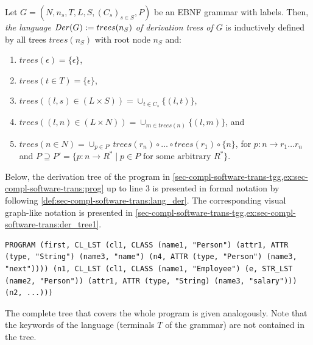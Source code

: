 \begin{definition}
\label{def:sec-compl-software-trans:lang_der}
Let $G=(N,n_s,T,L,S,(C_s)_{s \in S},P)$ be an EBNF grammar with labels.
Then, \emph{the language $\mathit{Der}(G):=trees(n_S)$ of derivation trees of $G$} is inductively defined by all trees $trees(n_S)$ with root node $n_S$ and:
\begin{enumerate}
  \item $trees(\epsilon)=\{\epsilon\}$,
  \item \label{item:sec-compl-software-trans:lang_der2}$trees(t \in T)=\{\epsilon\}$,
  \item $trees((l,s) \in (L \times S))=\cup_{t \in C_s}\{(l,t)\}$,
  \item $trees((l,n) \in (L \times N))=\cup_{m \in trees(n)}\{(l,m)\}$, and
  \item $trees(n \in N)=\cup_{p \in P'}trees(r_n) \circ \ldots \circ trees(r_1) \circ \{n\}$, for $p\colon n \to r_1 \ldots r_n$ and $P \supseteq P'=\{p\colon n \to R^* \mid p \in P \text{ for some arbitrary }R^*\}$.\envEndMarker 
\end{enumerate}
\end{definition}

\begin{example}
\label{ex:sec-compl-software-trans:der_tree}
Below, the derivation tree of the program in \cref{sec-compl-software-trans-tgg,ex:sec-compl-software-trans:prog} up to line 3 is presented in formal notation by following \cref{def:sec-compl-software-trans:lang_der}.
The corresponding visual graph-like notation is presented in \cref{sec-compl-software-trans-tgg,ex:sec-compl-software-trans:der_tree1}.
 
\begin{lstlisting}[frame=none,language=pseudocode]
PROGRAM (first, CL_LST (cl1, CLASS (name1, "Person") (attr1, ATTR (type, "String") (name3, "name") (n4, ATTR (type, "Person") (name3, "next")))) (n1, CL_LST (cl1, CLASS (name1, "Employee") (e, STR_LST (name2, "Person")) (attr1, ATTR (type, "String) (name3, "salary"))) (n2, ...)))
\end{lstlisting}

The complete tree that covers the whole program is given analogously.
Note that the keywords of the language (terminals $T$ of the grammar) are not contained in the tree.
\envEndMarker
\end{example}

